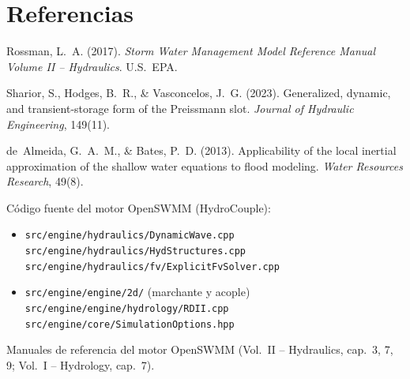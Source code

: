 \documentclass[11pt,a4paper]{article}
\newcommand{\src}[1]{\texttt{src/engine/#1}}
\begin{document}
\section{Referencias}

\begin{enumerate}[nosep,label={[\arabic*]}]
  \item Rossman, L.~A. (2017). \emph{Storm Water Management Model Reference
        Manual Volume II -- Hydraulics}. U.S.\ EPA.
  \item Sharior, S., Hodges, B.~R., \& Vasconcelos, J.~G. (2023).
        Generalized, dynamic, and transient-storage form of the Preissmann
        slot. \emph{Journal of Hydraulic Engineering}, 149(11).
  \item de~Almeida, G.~A.~M., \& Bates, P.~D. (2013). Applicability of the
        local inertial approximation of the shallow water equations to flood
        modeling. \emph{Water Resources Research}, 49(8).
  \item Código fuente del motor OpenSWMM (HydroCouple):
        \begin{itemize}[nosep,itemsep=0pt]
          \item \src{hydraulics/DynamicWave.cpp} \\
                \src{hydraulics/HydStructures.cpp} \\
                \src{hydraulics/fv/ExplicitFvSolver.cpp}
          \item \src{engine/2d/} (marchante y acople) \\
                \src{engine/hydrology/RDII.cpp} \\
                \src{core/SimulationOptions.hpp}
        \end{itemize}
  \item Manuales de referencia del motor OpenSWMM (Vol.\ II -- Hydraulics,
        cap.\ 3, 7, 9; Vol.\ I -- Hydrology, cap.\ 7).
\end{enumerate}
\end{document}
